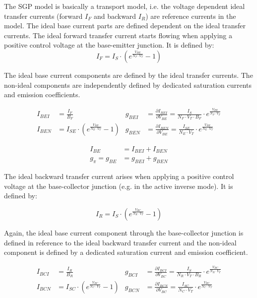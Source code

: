 \documentclass[10pt]{report}
\begin{document}
The SGP model is basically a transport model, i.e. the voltage
dependent ideal transfer currents (forward $I_F$ and backward $I_R$)
are reference currents in the model.  The ideal base current parts are
defined dependent on the ideal transfer currents.  The ideal forward
transfer current starts flowing when applying a positive control
voltage at the base-emitter junction.  It is defined by:
\begin{equation}
I_F = I_S\cdot \left(e^{\frac{V_{BE}}{N_F\cdot V_T}} -1\right)
\end{equation}

The ideal base current components are defined by the ideal transfer
currents.  The non-ideal components are independently defined by
dedicated saturation currents and emission coefficients.

\begin{align}
I_{BEI} &= \frac{I_F}{B_F} &
g_{BEI} &= \frac{\partial I_{BEI}}{\partial V_{BE}} = \frac{I_S}{N_F\cdot V_T \cdot B_F}\cdot e^{\frac{V_{BE}}{N_F\cdot V_T}}\\
I_{BEN} &= I_{SE}\cdot \left(e^{\frac{V_{BE}}{N_E\cdot V_T}} -1\right) &
g_{BEN} &= \frac{\partial I_{BEN}}{\partial V_{BE}} = \frac{I_{SE}}{N_E\cdot V_T}\cdot e^{\frac{V_{BE}}{N_E\cdot V_T}}
\end{align}

\begin{align}
I_{BE} &= I_{BEI} + I_{BEN}\\
g_{\pi} = g_{BE} &= g_{BEI} + g_{BEN}
\end{align}

The ideal backward transfer current arises when applying a positive
control voltage at the base-collector junction (e.g. in the active
inverse mode).  It is defined by:

\begin{equation}
I_R = I_S\cdot \left(e^{\frac{V_{BC}}{N_R\cdot V_T}} -1\right)
\end{equation}

Again, the ideal base current component through the base-collector
junction is defined in reference to the ideal backward transfer
current and the non-ideal component is defined by a dedicated
saturation current and emission coefficient.

\begin{align}
I_{BCI} &= \frac{I_R}{B_R} &
g_{BCI} &= \frac{\partial I_{BCI}}{\partial V_{BC}} = \frac{I_S}{N_R\cdot V_T \cdot B_R}\cdot e^{\frac{V_{BC}}{N_R\cdot V_T}}\\
I_{BCN} &= I_{SC}\cdot \left(e^{\frac{V_{BC}}{N_C\cdot V_T}} -1\right) &
g_{BCN} &= \frac{\partial I_{BCN}}{\partial V_{BC}} = \frac{I_{SC}}{N_C\cdot V_T}\cdot e^{\frac{V_{BC}}{N_C\cdot V_T}}
\end{align}
\end{document}
